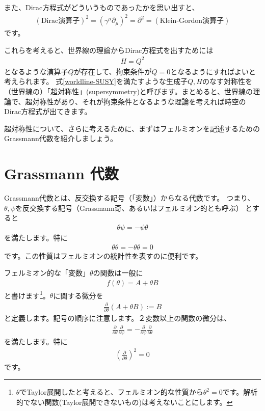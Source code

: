 \documentclass[report,paper=a4, fontsize=12pt, line_length=16cm, number_of_lines=34,dvipdfmx]{jlreq}
\numberwithin{equation}{chapter}
\numberwithin{equation}{section}
\newcommand{\del}{\partial}
\newcommand{\deldel}[2]{\frac{\del {#1}}{\del {#2}}}
\begin{document}
また、Dirac方程式がどういうものであったかを思い出すと、
\begin{align}
(\text{Dirac演算子})^2 =(\gamma^{\mu}\del_{\mu})^2
=\del^2 = (\text{Klein-Gordon演算子})
\end{align}
です。

これらを考えると、世界線の理論からDirac方程式を出すためには
\begin{align}
H=Q^2\label{worldline-SUSY}
\end{align}
となるような演算子$Q$が存在して、拘束条件が$Q=0$となるようにすればよいと考えられます。
式\eqref{worldline-SUSY}を満たすような生成子$Q,H$のなす対称性を（世界線の）「超対称性」(supersymmetry)と呼びます。まとめると、世界線の理論で、超対称性があり、それが拘束条件となるような理論を考えれば時空のDirac方程式が出てきます。

超対称性について、さらに考えるために、まずはフェルミオンを記述するためのGrassmann代数を紹介しましょう。
\section{Grassmann 代数}
Grassmann代数とは、反交換する記号（「変数」）からなる代数です。
つまり、$\theta,\psi$を反交換する記号（Grassmann奇、あるいはフェルミオン的とも呼ぶ）
とすると
\begin{align}
\theta\psi=-\psi\theta
\end{align}
を満たします。特に
\begin{align}
\theta\theta = -\theta\theta =0
\end{align}
です。この性質はフェルミオンの統計性を表すのに便利です。

フェルミオン的な「変数」$\theta$の関数は一般に
\begin{align}
f(\theta)=A+\theta B
\end{align}
と書けます\footnote{$\theta$でTaylor展開したと考えると、フェルミオン的な性質から$\theta^2=0$です。解析的でない関数(Taylor展開できないもの)は考えないことにします。}。$\theta$に関する微分を
\begin{align}
\deldel{}{\theta} (A+\theta B):=B
\end{align}
と定義します。記号の順序に注意します。２変数以上の関数の微分は、
\begin{align}
\deldel{}{\theta}\deldel{}{\psi}
=
-\deldel{}{\psi}\deldel{}{\theta}
\end{align}
を満たします。特に
\begin{align}
\left(\deldel{}{\theta}\right)^2=0
\end{align}
です。
\end{document}
